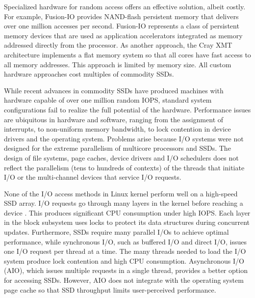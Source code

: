 Specialized hardware for random access offers an effective solution,
albeit costly.  For example, Fusion-IO provides 
NAND-flash persistent memory that delivers over one million accesses per second.
Fusion-IO represents a class of persistent memory devices that are used as 
application accelerators integrated as memory addressed directly from the processor.  
As another approach, the Cray XMT architecture implements a flat memory system so 
that all cores have fast access to all memory addresses.  This approach
is limited by memory size.  All custom hardware approaches cost multiples of commodity SSDs.

While recent advances in commodity SSDs have
produced machines with hardware capable of over one million random IOPS,
standard system configurations fail to realize the full potential 
of the hardware. 
Performance issues are ubiquitous in hardware and software, ranging from the assignment of interrupts, to non-uniform
memory bandwidth, to lock contention in device drivers and the operating system.
Problems arise because I/O systems were not designed for the extreme
parallelism of multicore processors and SSDs.  The design of file systems, page caches, device
drivers and I/O schedulers does not reflect the parallelism (tens to hundreds of contexts)
of the threads that initiate I/O or the multi-channel devices that service I/O requests.



None of the I/O access methods in Linux kernel perform well on a high-speed SSD array.
I/O requests go through many layers in the kernel before reaching a device \cite{Foong10}.
This produces significant CPU consumption under high IOPS.
Each layer in the block subsystem uses locks to protect its data
structures during concurrent updates. Furthermore, SSDs require many parallel
I/Os to achieve optimal performance, while synchronous I/O, 
such as buffered I/O and direct I/O, issues one I/O request per thread at a time.
The many threads needed to load the I/O system produce lock contention
and high CPU consumption.
%
Asynchronous I/O (AIO), which issues multiple requests in a single thread, provides a better
option for accessing SSDs. However, AIO does not integrate with the operating 
system page cache so that SSD throughput limits user-perceived performance.

